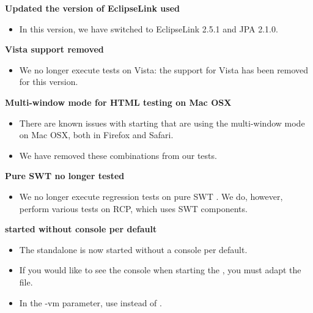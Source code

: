 \textbf{Updated the version of EclipseLink used}
\begin{itemize}
\item In this version, we have switched to EclipseLink 2.5.1 and JPA 2.1.0.
\end{itemize}

\textbf{Vista support removed}
\begin{itemize}
\item We no longer execute tests on Vista: the support for Vista has been removed for this version.
\end{itemize}

\textbf{Multi-window mode for HTML testing on Mac OSX}
\begin{itemize}
\item There are known issues with starting \gdauts{} that are using the multi-window mode on Mac OSX, both in Firefox and Safari.
\item We have removed these combinations from our tests.
\end{itemize}

\textbf{Pure SWT \gdauts{} no longer tested}
\begin{itemize}
\item We no longer execute regression tests on pure SWT \gdauts{}. We do, however, perform various tests on RCP, which uses SWT components. 
\end{itemize}

\textbf{\gdagent{} started without console per default}
\begin{itemize}
\item The standalone \gdagent{} is now started without a console per default.
\item If you would like to see the console when starting the \gdagent{}, you must adapt the  file.
\item In the -vm parameter, use  instead of .
\end{itemize}

